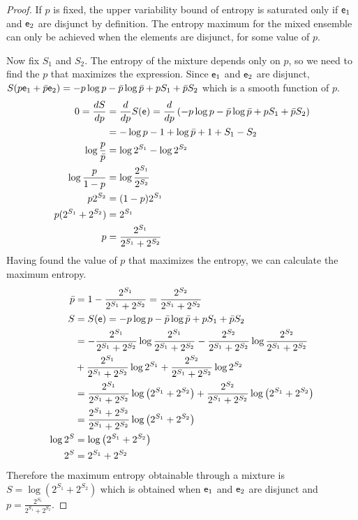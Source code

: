 \begin{proof}
	If $p$ is fixed, the upper variability bound of entropy is saturated only if $\mathsf{e}_1$ and $\mathsf{e}_2$ are disjunct by definition. The entropy maximum for the mixed ensemble can only be achieved when the elements are disjunct, for some value of $p$.
	
	Now fix $S_1$ and $S_2$. The entropy of the mixture depends only on $p$, so we need to find the $p$ that maximizes the expression. Since $\mathsf{e}_1$ and $\mathsf{e}_2$ are disjunct, $S(p \mathsf{e}_1 + \bar{p}\mathsf{e}_2) =  - p \log p - \bar{p} \log \bar{p} + p S_1 + \bar{p} S_2$ which is a smooth function of $p$.
	\begin{equation}
		\begin{aligned}
			0 = \frac{dS}{dp} &= \frac{d}{dp} S(\mathsf{e}) =\frac{d}{dp} \left( - p \log p - \bar{p} \log \bar{p} + p S_1 + \bar{p} S_2 \right) \\
			&= - \log p - 1 + \log \bar{p} + 1 + S_1 - S_2 \\
			\log \frac{p}{\bar{p}} &= \log 2^{S_1} - \log 2^{S_2} \\
			\log \frac{p}{1-p} &= \log \frac{2^{S_1}}{2^{S_2}}  \\
			p 2^{S_2} &= (1-p) 2^{S_1}  \\
			p (2^{S_1} + 2^{S_2}) &= 2^{S_1}  \\
			p &= \frac{2^{S_1}}{2^{S_1} + 2^{S_2}}  \\
		\end{aligned}
	\end{equation}
	Having found the value of $p$ that maximizes the entropy, we can calculate the maximum entropy.
	\begin{equation}
	\begin{aligned}
		\bar{p} &= 1- \frac{2^{S_1}}{2^{S_1} + 2^{S_2}} = \frac{2^{S_2}}{2^{S_1} + 2^{S_2}} \\
		S &= S(\mathsf{e}) = - p \log p - \bar{p} \log \bar{p} + p S_1 + \bar{p} S_2  \\
		&= - \frac{2^{S_1}}{2^{S_1} + 2^{S_2}} \log \frac{2^{S_1}}{2^{S_1} + 2^{S_2}} - \frac{2^{S_2}}{2^{S_1} + 2^{S_2}} \log \frac{2^{S_2}}{2^{S_1} + 2^{S_2}} \\
		&+ \frac{2^{S_1}}{2^{S_1} + 2^{S_2}} \log 2^{S_1} + \frac{2^{S_2}}{2^{S_1} + 2^{S_2}} \log 2^{S_2} \\
		&= \frac{2^{S_1}}{2^{S_1} + 2^{S_2}} \log \left( 2^{S_1} + 2^{S_2} \right) + \frac{2^{S_2}}{2^{S_1} + 2^{S_2}} \log \left( 2^{S_1} + 2^{S_2} \right) \\
		&= \frac{2^{S_1} + 2^{S_2}}{2^{S_1} + 2^{S_2}} \log \left( 2^{S_1} + 2^{S_2} \right) \\
		\log 2^S &= \log \left( 2^{S_1} + 2^{S_2} \right) \\
		2^S &=  2^{S_1} + 2^{S_2}  \\
	\end{aligned}
	\end{equation}
	Therefore the maximum entropy obtainable through a mixture is $S = \log (2^{S_1} + 2^{S_2})$ which is obtained when $\mathsf{e}_1$ and $\mathsf{e}_2$ are disjunct and $p = \frac{2^{S_1}}{2^{S_1} + 2^{S_2}}$.
\end{proof}

